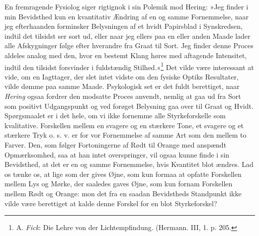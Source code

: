\documentclass[12pt,a4paper,openany]{book}
\newcommand{\opage}[1]{\marginnote{\footnotesize\textit{[#1]}}}
\begin{document}
En fremragende Fysiolog siger rigtignok i sin Polemik mod Hering: »Jeg
finder i min Bevidsthed kun en kvantitativ Ændring af en og samme
Fornemmelse, naar jeg efterhaanden forminsker Belysningen af et hvidt
Papirsblad i Synskredsen, indtil det tilsidst ser sort ud, eller naar
jeg ellers paa en eller anden Maade lader alle Afskygninger følge efter
hverandre fra Graat til Sort. Jeg finder denne Proces aldeles analog med
den, hvor en bestemt Klang høres med aftagende Intensitet, indtil den
tilsidst forsvinder i fuldstændig Stilhed.«\footnote[1]{A. \emph{Fick}:
Die Lehre von der Lichtempfindung. (Hermann. III, 1. p. 205.} Det vilde
være interessant at vide, om en Iagttager, der slet intet vidste om den
fysiske Optiks Resultater, vilde dømme paa samme Maade. Psykologisk set
er det fuldt berettiget, naar \emph{Hering} ogsaa fordrer den modsatte
Proces anvendt, nemlig at gaa ud fra Sort som positivt Udgangspunkt og
ved forøget Belysning gaa over til Graat og Hvidt. Spørgsmaalet er i det
hele, om vi ikke fornemme alle Styrkeforskelle som kvalitative.
Forskellen mellem en svagere og en stærkere Tone, et svagere og et
stærkere Tryk o. s. v. er for vor Fornemmelse af samme
\opage{136}Art som den mellem to Farver. Den, som følger Fortoningerne
af Rødt til Orange med anspændt Opmærksomhed, saa at han intet
overspringer, vil ogsaa kunne finde i sin Bevidsthed, at det er en og
samme Fornemmelse, hvis Kvantitet blot ændres. Lad os tænke os, at lige
som der gives Øjne, som kun formaa at opfatte Forskellen mellem Lys og
Mørke, der saaledes gaves Øjne, som kun fornam Forskellen mellem Rødt og
Orange: mon det fra en saadan Bevidstheds Standpunkt ikke vilde være
berettiget at kalde denne Forskel for en blot Styrkeforskel?
\end{document}
